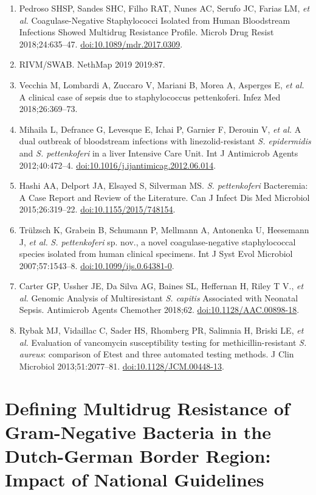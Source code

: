 \documentclass[
]{book}
\begin{document}
\begin{enumerate}
\item
  Pedroso SHSP, Sandes SHC, Filho RAT, Nunes AC, Serufo JC, Farias LM, \emph{et al.} Coagulase-Negative Staphylococci Isolated from Human Bloodstream Infections Showed Multidrug Resistance Profile. Microb Drug Resist 2018;24:635--47. \url{doi:10.1089/mdr.2017.0309}.
\item
  RIVM/SWAB. NethMap 2019 2019:87.
\item
  Vecchia M, Lombardi A, Zuccaro V, Mariani B, Morea A, Asperges E, \emph{et al.} A clinical case of sepsis due to staphylococcus pettenkoferi. Infez Med 2018;26:369--73.
\item
  Mihaila L, Defrance G, Levesque E, Ichai P, Garnier F, Derouin V, \emph{et al.} A dual outbreak of bloodstream infections with linezolid-resistant \emph{S. epidermidis} and \emph{S. pettenkoferi} in a liver Intensive Care Unit. Int J Antimicrob Agents 2012;40:472--4. \url{doi:10.1016/j.ijantimicag.2012.06.014}.
\item
  Hashi AA, Delport JA, Elsayed S, Silverman MS. \emph{S. pettenkoferi} Bacteremia: A Case Report and Review of the Literature. Can J Infect Dis Med Microbiol 2015;26:319--22. \url{doi:10.1155/2015/748154}.
\item
  Trülzsch K, Grabein B, Schumann P, Mellmann A, Antonenka U, Heesemann J, \emph{et al.} \emph{S. pettenkoferi} sp. nov., a novel coagulase-negative staphylococcal species isolated from human clinical specimens. Int J Syst Evol Microbiol 2007;57:1543--8. \url{doi:10.1099/ijs.0.64381-0}.
\item
  Carter GP, Ussher JE, Da Silva AG, Baines SL, Heffernan H, Riley T V., \emph{et al.} Genomic Analysis of Multiresistant \emph{S. capitis} Associated with Neonatal Sepsis. Antimicrob Agents Chemother 2018;62. \url{doi:10.1128/AAC.00898-18}.
\item
  Rybak MJ, Vidaillac C, Sader HS, Rhomberg PR, Salimnia H, Briski LE, \emph{et al.} Evaluation of vancomycin susceptibility testing for methicillin-resistant \emph{S. aureus}: comparison of Etest and three automated testing methods. J Clin Microbiol 2013;51:2077--81. \url{doi:10.1128/JCM.00448-13}.
\end{enumerate}

\hypertarget{ch08-defining-mdr}{%
\chapter{Defining Multidrug Resistance of Gram-Negative Bacteria in the Dutch-German Border Region: Impact of National Guidelines}\label{ch08-defining-mdr}}
\end{document}
